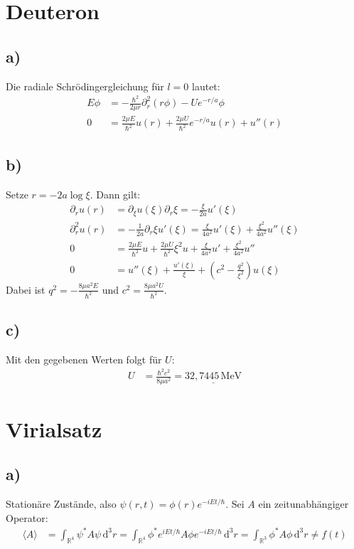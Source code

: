 \documentclass[a4paper,12pt]{article}
\newcommand{\bra}{}
\newcommand{\intr}{}
\newcommand{\kla}{}
\newcommand{\tecxt}{}
\begin{document}
\section{Deuteron}
\subsection*{a)}
Die radiale Schrödingergleichung für $l=0$ lautet:
\begin{align*}
E\phi&=-\frac{\hbar^2}{2\mu r}\partial_r^2(r\phi)-Ue^{-r/a}\phi \\
0&=\frac{2\mu E}{\hbar^2}u(r)+\frac{2\mu U}{\hbar^2}e^{-r/a}u(r)+u''(r)
\end{align*}
\subsection*{b)}
Setze $r=-2a\log \xi$. Dann gilt:
\begin{align*}
\partial_ru(r)&=\partial_\xi u(\xi)\partial_r\xi=-\frac{\xi}{2a} u'(\xi)\\
\partial_r^2u(r)&=-\frac{1}{2a}\partial_r\xi u'(\xi)=\frac{\xi}{4a^2}u'(\xi)+\frac{\xi^2}{4a^2}u''(\xi)\\
0&=\frac{2\mu E}{\hbar^2}u+\frac{2\mu U}{\hbar^2}\xi^2u+\frac{\xi}{4a^2}u'+\frac{\xi^2}{4a^2}u'' \\
0&=u''(\xi)+\frac{u'(\xi)}{\xi}+\kla\left( {c^2-\frac{q^2}{\xi^2}} \right)u(\xi)
\end{align*}
Dabei ist $q^2= -\frac{8\mu a^2E}{\hbar^2}$ und $c^2= \frac{8\mu a^2U}{\hbar^2}$.
\subsection*{c)}
Mit den gegebenen Werten folgt für $U$:
\begin{align*}
U&=\frac{\hbar^2c^2}{8\mu a^2}=\underline{32,7445\,\tecxt\text{MeV}}
\end{align*}
\section{Virialsatz}
\subsection*{a)}
Stationäre Zustände, also $\psi(r,t)=\phi(r)e^{-iEt/\hbar}$. Sei $A$ ein zeitunabhängiger Operator:
\begin{align*}
\bra\langle {A}\rangle&=\intr\int_{\mathbb{R}^{4}}{\psi^\ast A\psi}\,\mathrm{d}^{3}r=\intr\int_{\mathbb{R}^{4}}{\phi^\ast e^{iEt/\hbar} A\phi e^{-iEt/\hbar}}\,\mathrm{d}^{3}r=\intr\int_{\mathbb{R}^{3}}{\phi^\ast A\phi}\,\mathrm{d}^{3}r\neq f(t)
\end{align*}
\end{document}
